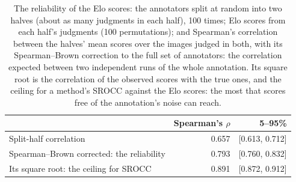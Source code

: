 \begin{table}[htbp]
  \centering
  \caption{The reliability of the Elo scores: the annotators split at random into two halves (about as many judgments in each half), 100 times; Elo scores from each half's judgments (100 permutations); and Spearman's correlation between the halves' mean scores over the images judged in both, with its Spearman--Brown correction to the full set of annotators: the correlation expected between two independent runs of the whole annotation. Its square root is the correlation of the observed scores with the true ones, and the ceiling for a method's SROCC against the Elo scores: the most that scores free of the annotation's noise can reach.}
  \label{tab:split_half_ceiling}
  \begin{tabular}{lrr}
    \toprule
     & Spearman's $\rho$ & 5--95\% \\
    \midrule
    Split-half correlation & 0.657 & [0.613, 0.712] \\
    Spearman--Brown corrected: the reliability & 0.793 & [0.760, 0.832] \\
    Its square root: the ceiling for SROCC & 0.891 & [0.872, 0.912] \\
    \bottomrule
  \end{tabular}
\end{table}
